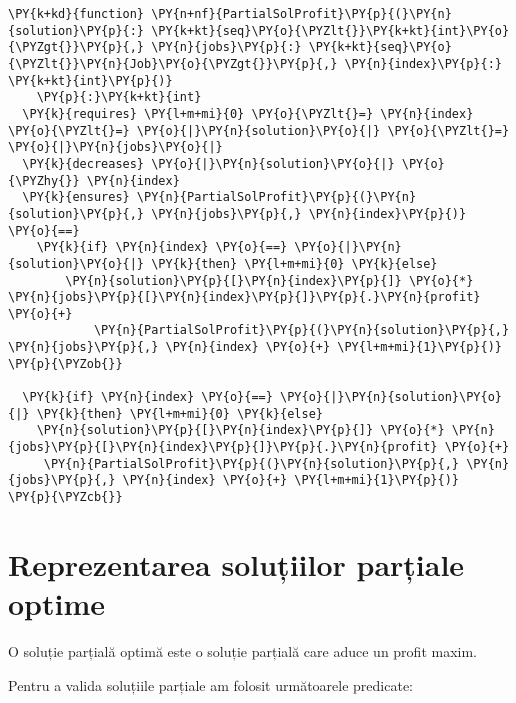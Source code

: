 \begin{Verbatim}[commandchars=\\\{\},fontsize=\footnotesize]
\PY{k+kd}{function} \PY{n+nf}{PartialSolProfit}\PY{p}{(}\PY{n}{solution}\PY{p}{:} \PY{k+kt}{seq}\PY{o}{\PYZlt{}}\PY{k+kt}{int}\PY{o}{\PYZgt{}}\PY{p}{,} \PY{n}{jobs}\PY{p}{:} \PY{k+kt}{seq}\PY{o}{\PYZlt{}}\PY{n}{Job}\PY{o}{\PYZgt{}}\PY{p}{,} \PY{n}{index}\PY{p}{:} \PY{k+kt}{int}\PY{p}{)}
    \PY{p}{:}\PY{k+kt}{int}
  \PY{k}{requires} \PY{l+m+mi}{0} \PY{o}{\PYZlt{}=} \PY{n}{index} \PY{o}{\PYZlt{}=} \PY{o}{|}\PY{n}{solution}\PY{o}{|} \PY{o}{\PYZlt{}=} \PY{o}{|}\PY{n}{jobs}\PY{o}{|}
  \PY{k}{decreases} \PY{o}{|}\PY{n}{solution}\PY{o}{|} \PY{o}{\PYZhy{}} \PY{n}{index}
  \PY{k}{ensures} \PY{n}{PartialSolProfit}\PY{p}{(}\PY{n}{solution}\PY{p}{,} \PY{n}{jobs}\PY{p}{,} \PY{n}{index}\PY{p}{)} \PY{o}{==} 
    \PY{k}{if} \PY{n}{index} \PY{o}{==} \PY{o}{|}\PY{n}{solution}\PY{o}{|} \PY{k}{then} \PY{l+m+mi}{0} \PY{k}{else}
        \PY{n}{solution}\PY{p}{[}\PY{n}{index}\PY{p}{]} \PY{o}{*} \PY{n}{jobs}\PY{p}{[}\PY{n}{index}\PY{p}{]}\PY{p}{.}\PY{n}{profit} \PY{o}{+} 
            \PY{n}{PartialSolProfit}\PY{p}{(}\PY{n}{solution}\PY{p}{,} \PY{n}{jobs}\PY{p}{,} \PY{n}{index} \PY{o}{+} \PY{l+m+mi}{1}\PY{p}{)}
\PY{p}{\PYZob{}}

  \PY{k}{if} \PY{n}{index} \PY{o}{==} \PY{o}{|}\PY{n}{solution}\PY{o}{|} \PY{k}{then} \PY{l+m+mi}{0} \PY{k}{else} 
    \PY{n}{solution}\PY{p}{[}\PY{n}{index}\PY{p}{]} \PY{o}{*} \PY{n}{jobs}\PY{p}{[}\PY{n}{index}\PY{p}{]}\PY{p}{.}\PY{n}{profit} \PY{o}{+}
     \PY{n}{PartialSolProfit}\PY{p}{(}\PY{n}{solution}\PY{p}{,} \PY{n}{jobs}\PY{p}{,} \PY{n}{index} \PY{o}{+} \PY{l+m+mi}{1}\PY{p}{)}
\PY{p}{\PYZcb{}}
\end{Verbatim}

\section{Reprezentarea soluțiilor parțiale optime}

O soluție parțială optimă este o soluție parțială care aduce un profit maxim. 

Pentru a valida soluțiile parțiale am folosit următoarele predicate: 

